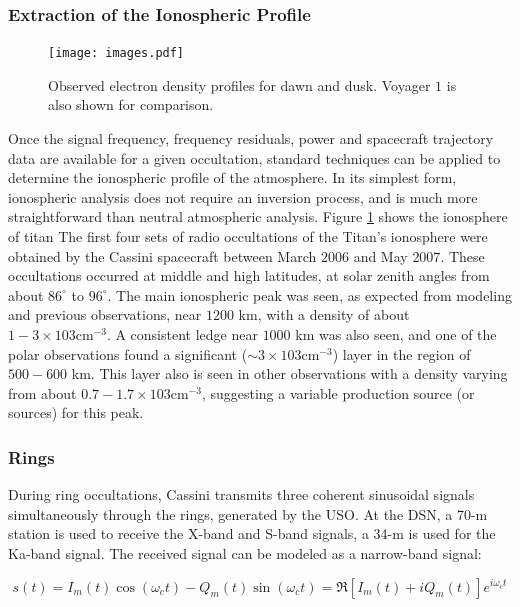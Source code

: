 \documentclass{article}
\theoremstyle{mystyle}
\begin{document}
\subsubsection{\footnotesize Extraction of the Ionospheric Profile}
%
\begin{figure}
	\centering
    \vspace{-5ex}
	\texttt{[image: images.pdf]}
	\caption[Observed Electron Density Profile of Titan]{Observed electron density profiles for dawn and dusk. Voyager $1$ is also shown for comparison.}
	\label{fig:atmo_ionosphere_kliore_et_al}
\end{figure}
%
Once the signal frequency, frequency residuals, power and spacecraft trajectory data are available for a given occultation, standard techniques can be applied to determine the ionospheric profile of the atmosphere. In its simplest form, ionospheric analysis does not require an inversion process, and is much more straightforward than neutral atmospheric analysis. Figure \ref{fig:atmo_ionosphere_kliore_et_al} shows the ionosphere of \gls{titan} The first four sets of radio occultations of the Titan's ionosphere were obtained by the Cassini spacecraft between March $2006$ and May $2007$. These occultations occurred at middle and high latitudes, at solar zenith angles from about $86^{\circ}$ to $96^{\circ}$. The main ionospheric peak was seen, as expected from modeling and previous observations, near $1200$ km, with a density of about $1-3 \times 103 \textrm{cm}^{-3}$. A consistent ledge near $1000$ km was also seen, and one of the polar observations found a significant ($\sim 3 \times 103 \textrm{cm}^{-3}$) layer in the region of $500-600$ km. This layer also is seen in other observations with a density varying from about $0.7 - 1.7 \times 103 \textrm{cm}^{-3}$, suggesting a variable production source (or sources) for this peak.
%
\subsubsection{Rings}
%
During ring occultations, Cassini transmits three coherent sinusoidal signals simultaneously through the rings, generated by the USO. At the DSN, a 70-m station is used to receive the X-band and S-band signals, a 34-m is used for the Ka-band signal. The received signal can be modeled as a narrow-band signal:

\begin{equation}
s(t) = I_{m}(t)\cos(\omega_{c}t)-Q_{m}(t)\sin(\omega_{c}t) = \Re{[I_{m}(t)+iQ_{m}(t)]e^{i\omega_{c}t}}
\end{equation}
\end{document}
